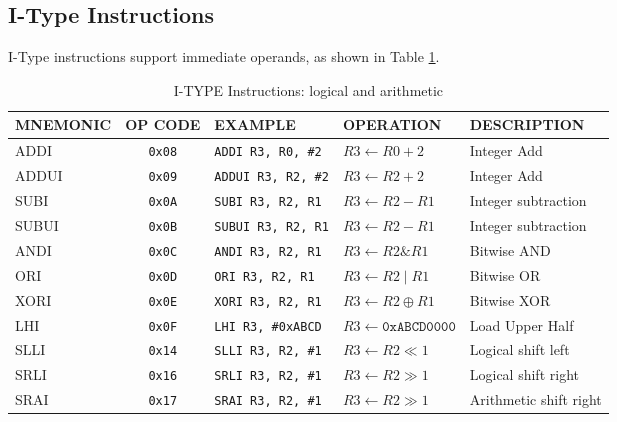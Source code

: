 \newpage
\subsection{I-Type Instructions}

I-Type instructions support immediate operands, as shown in Table \ref{table:i_type_airth_logic}. 

\begin{table}[H]
\begin{tabularx}{\textwidth}{|l|c|l|l|X|}
    \hline
    MNEMONIC & OP CODE & EXAMPLE & OPERATION & DESCRIPTION \\ 
    \hline
    ADDI & \texttt{0x08} & \texttt{ADDI R3, R0, \#2} & $R3 \leftarrow R0 + 2$ & Integer Add\\ 
    \hline
    ADDUI & \texttt{0x09} & \texttt{ADDUI R3, R2, \#2} & $R3 \leftarrow R2 + 2$ & Integer Add\\ 
    \hline
    SUBI & \texttt{0x0A} & \texttt{SUBI R3, R2, R1} & $R3 \leftarrow R2 - R1$ & Integer subtraction\\ 
    \hline
    SUBUI & \texttt{0x0B} & \texttt{SUBUI R3, R2, R1} & $R3 \leftarrow R2 - R1$ & Integer subtraction\\ 
    \hline
    ANDI & \texttt{0x0C} & \texttt{ANDI R3, R2, R1} & $R3 \leftarrow R2 \texttt{\&} R1$ & Bitwise AND\\ 
    \hline
    ORI & \texttt{0x0D} & \texttt{ORI R3, R2, R1} & $R3 \leftarrow R2 \mid R1$ & Bitwise OR\\ 
    \hline
    XORI & \texttt{0x0E} & \texttt{XORI R3, R2, R1} & $R3 \leftarrow R2 \oplus R1$ & Bitwise XOR\\ 
    \hline
    LHI & \texttt{0x0F} & \texttt{LHI R3, \#0xABCD} & $R3 \leftarrow \texttt{0xABCD0000}$ & Load Upper Half\\ 
    \hline
    SLLI & \texttt{0x14} & \texttt{SLLI R3, R2, \#1} & $R3 \leftarrow R2 \ll 1$ & Logical shift left\\ 
    \hline
    SRLI & \texttt{0x16} & \texttt{SRLI R3, R2, \#1} & $R3 \leftarrow R2 \gg 1$ & Logical shift right\\ 
    \hline
    SRAI & \texttt{0x17} & \texttt{SRAI R3, R2, \#1} & $R3 \leftarrow R2 \gg 1$ & Arithmetic shift right\\ 
    \hline
\end{tabularx}
\caption{I-TYPE Instructions: logical and arithmetic}
\label{table:i_type_airth_logic}
\end{table}


